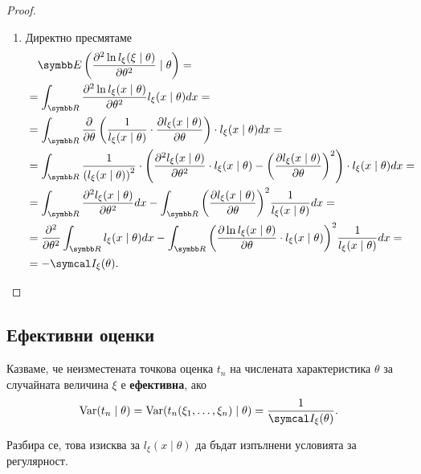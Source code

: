 \documentclass[
  numbers=endperiod,
  headings=standardclasses,
  bibliography=totocnumbered,
]{scrartcl}
\begin{document}
\begin{proof}
\begin{enumerate}
    \item Директно пресмятаме
    \begin{align*}
      &\quad\Expect\left( \frac {\partial^2 \ln l_\xi(\xi \mid \theta)} {\partial \theta^2} \mid \theta \right)
      = \\ &=
      \int_{\R} \frac {\partial^2 \ln l_\xi(x \mid \theta)} {\partial \theta^2} l_\xi(x \mid \theta) dx
      = \\ &=
      \int_{\R} \frac \partial {\partial \theta} \left(\frac 1 {l_\xi(x \mid \theta)} \cdot \frac {\partial l_\xi(x \mid \theta)} {\partial \theta} \right) \cdot l_\xi(x \mid \theta) dx
      = \\ &=
      \int_{\R} \frac 1 {{(l_\xi(x \mid \theta))}^2} \cdot \left( \frac {\partial^2 l_\xi(x \mid \theta)} {\partial \theta^2} \cdot l_\xi(x \mid \theta) - {\left(\frac {\partial l_\xi(x \mid \theta)} {\partial \theta} \right)}^2 \right) \cdot l_\xi(x \mid \theta) dx
      = \\ &=
      \int_{\R} \frac {\partial^2 l_\xi(x \mid \theta)} {\partial \theta^2} dx - \int_{\R} {\left(\frac {\partial l_\xi(x \mid \theta)} {\partial \theta} \right)}^2 \frac 1 {l_\xi(x \mid \theta)} dx
      = \\ &=
      \frac {\partial^2} {\partial \theta^2} \int_{\R} l_\xi(x \mid \theta) dx - \int_{\R} {\left(\frac {\partial \ln l_\xi(x \mid \theta)} {\partial \theta} \cdot l_\xi(x \mid \theta) \right)}^2 \frac 1 {l_\xi(x \mid \theta)} dx
      = \\ &=
      -\FisherInfo_\xi(\theta).
    \end{align*}
  \end{enumerate}
\end{proof}

\subsection{Ефективни оценки}

\begin{definition}
  Казваме, че неизместената точкова оценка \( t_n \) на числената характеристика \( \theta \) за случайната величина \( \xi \) е \textbf{ефективна}, ако
  \begin{equation*}
    \Var(t_n \mid \theta) = \Var(t_n(\xi_1, \ldots, \xi_n) \mid \theta) = \frac 1 {\FisherInfo_\xi(\theta)}.
  \end{equation*}

  Разбира се, това изисква за \( l_\xi(x \mid \theta) \) да бъдат изпълнени условията за регулярност.
\end{definition}
\end{document}
